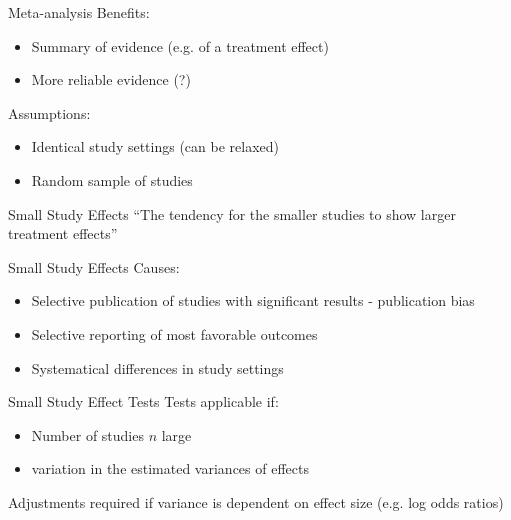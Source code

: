 \documentclass[english]{beamer}\usepackage[]{graphicx}\usepackage[]{color}
\begin{document}
\begin{frame}{Meta-analysis}
Benefits:
\begin{itemize}
\item Summary of evidence (e.g. of a treatment effect)
\item More reliable evidence (?)
\end{itemize}

Assumptions:
\begin{itemize}
\item Identical study settings (can be relaxed)
\item Random sample of studies
\end{itemize}
\end{frame}


\begin{frame}{Small Study Effects}
``The tendency for the smaller studies to show larger treatment effects'' \citep{Sterne}
\end{frame}


\begin{frame}{Small Study Effects}
Causes:
\begin{itemize}
\item Selective publication of studies with significant results - publication bias
\item Selective reporting of most favorable outcomes
\item Systematical differences in study settings
\end{itemize}
\end{frame}


\begin{frame}{Small Study Effect Tests}
Tests applicable if:
\begin{itemize}
\item Number of studies $n$ large
\item variation in the estimated variances of effects %
\end{itemize}
Adjustments required if variance is dependent on effect size (e.g. log odds ratios)
\end{frame}
\end{document}
